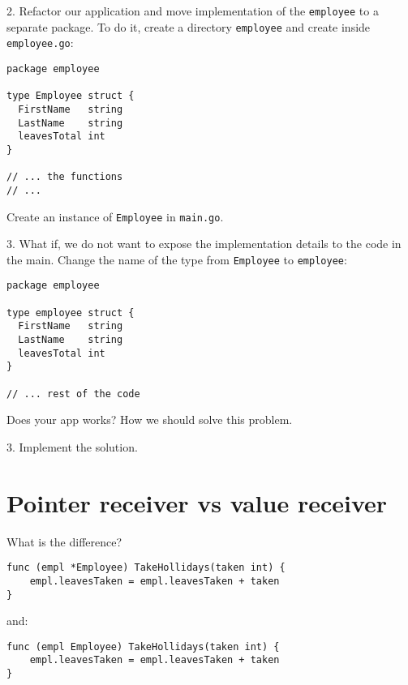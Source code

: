 \documentclass[11pt, letterpaper]{article}
\begin{document}
\bigskip

2. Refactor our application and move implementation of the \verb|employee| to a separate package. To do it, create a directory \verb|employee| and create inside \verb|employee.go|:

\begin{verbatim}
package employee

type Employee struct {
  FirstName   string
  LastName    string
  leavesTotal int
}

// ... the functions
// ...

\end{verbatim}

Create an instance of \verb|Employee| in \verb|main.go|.

\bigskip

3. What if, we do not want to expose the implementation details to the code in the main. Change the name of the type from \verb|Employee| to \verb|employee|:

\begin{verbatim}
package employee

type employee struct {
  FirstName   string
  LastName    string
  leavesTotal int
}

// ... rest of the code
\end{verbatim}

Does your app works? How we should solve this problem.

\bigskip

3. Implement the solution.



\section{Pointer receiver vs value receiver}

What is the difference?

\begin{verbatim}
func (empl *Employee) TakeHollidays(taken int) {
    empl.leavesTaken = empl.leavesTaken + taken
}
\end{verbatim}

and:

\begin{verbatim}
func (empl Employee) TakeHollidays(taken int) {
    empl.leavesTaken = empl.leavesTaken + taken
}
\end{verbatim}
\end{document}
